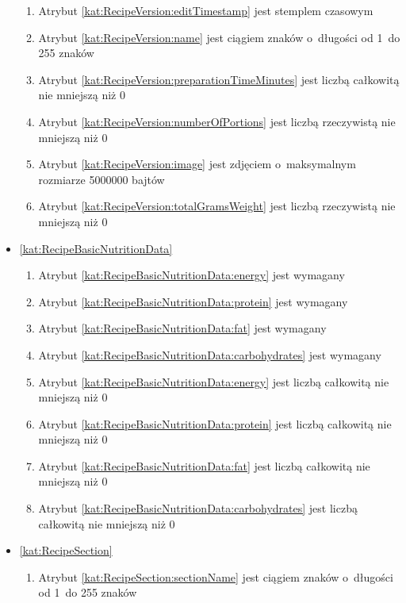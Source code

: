 \begin{itemize}[label={\textbf{Ograniczenia dla}}, wide, labelwidth=!, labelindent=0pt]
\begin{enumerate}[label={\textbf{OGR/\protect\threedigits{\arabic{enumi}}}}, wide, labelwidth=!, align=left, leftmargin=3cm, resume]
        \item Atrybut \ref{kat:RecipeVersion:editTimestamp} jest stemplem czasowym
        \item Atrybut \ref{kat:RecipeVersion:name} jest ciągiem znaków o~długości od 1~do 255 znaków
        \item Atrybut \ref{kat:RecipeVersion:preparationTimeMinutes} jest liczbą całkowitą nie mniejszą niż 0
        \item Atrybut \ref{kat:RecipeVersion:numberOfPortions} jest liczbą rzeczywistą nie mniejszą niż 0
        \item Atrybut \ref{kat:RecipeVersion:image} jest zdjęciem o~maksymalnym rozmiarze 5000000 bajtów
        \item Atrybut \ref{kat:RecipeVersion:totalGramsWeight} jest liczbą rzeczywistą nie mniejszą niż 0
    \end{enumerate}

    \item\ref{kat:RecipeBasicNutritionData}
    \begin{enumerate}[label={\textbf{OGR/\protect\threedigits{\arabic{enumi}}}}, wide, labelwidth=!, align=left, leftmargin=3cm, resume]
        \item Atrybut \ref{kat:RecipeBasicNutritionData:energy} jest wymagany
        \item Atrybut \ref{kat:RecipeBasicNutritionData:protein} jest wymagany
        \item Atrybut \ref{kat:RecipeBasicNutritionData:fat} jest wymagany
        \item Atrybut \ref{kat:RecipeBasicNutritionData:carbohydrates} jest wymagany

        \item Atrybut \ref{kat:RecipeBasicNutritionData:energy} jest liczbą całkowitą nie mniejszą niż 0
        \item Atrybut \ref{kat:RecipeBasicNutritionData:protein} jest liczbą całkowitą nie mniejszą niż 0
        \item Atrybut \ref{kat:RecipeBasicNutritionData:fat} jest liczbą całkowitą nie mniejszą niż 0
        \item Atrybut \ref{kat:RecipeBasicNutritionData:carbohydrates} jest liczbą całkowitą nie mniejszą niż 0
    \end{enumerate}

    \item\ref{kat:RecipeSection}
    \begin{enumerate}[label={\textbf{OGR/\protect\threedigits{\arabic{enumi}}}}, wide, labelwidth=!, align=left, leftmargin=3cm, resume]
        \item Atrybut \ref{kat:RecipeSection:sectionName} jest ciągiem znaków o~długości od 1~do 255 znaków
    \end{enumerate}


\end{itemize}
